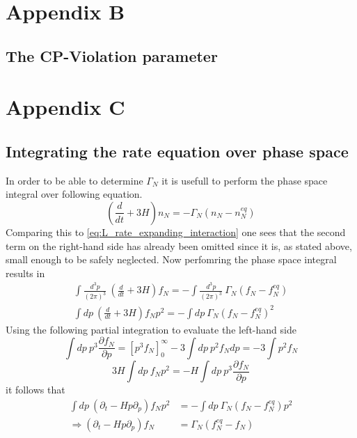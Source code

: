 \chapter{Appendix B}
\section{The CP-Violation parameter}








\chapter{Appendix C}
\section{Integrating the rate equation over phase space}
\label{ap:phase_space}
In order to be able to determine $\Gamma_N$ it is usefull to perform the phase space integral over following equation. 
\begin{equation*}
\left(\frac{d}{dt}+3H\right)n_N=-\Gamma_N\left(n_N-n_N^{eq}\right)
\end{equation*}
Comparing this to \ref{eq:L_rate_expanding_interaction} one sees that the second term on the right-hand side has already been omitted since it is, as stated above, small enough to be safely neglected. \newline
Now perfomring the phase space integral results in
\begin{align*}
\int\frac{d^3p}{\left(2\pi\right)^3}\: \left(\frac{d}{dt}+3H\right)f_N=-\int\frac{d^3p}{\left(2\pi\right)^3}\:\Gamma_N\left(f_N-f_N^{eq}\right)\\
\int dp\: \left(\frac{d}{dt}+3H\right)f_Np^2=-\int dp\:\Gamma_N\left(f_N-f_N^{eq}\right)^2
\end{align*}
Using the following partial integration to evaluate the left-hand side
\begin{equation*}
\int dp\:p^3\frac{\partial f_N}{\partial p}=\left[p^3f_N\right]_0^\infty-3\int dp\:p^2f_Ndp=-3\int p^2f_N
\end{equation*}
\begin{equation*}
3H\int dp\: f_Np^2=-H\int dp\: p^3\frac{\partial f_N}{\partial p}
\end{equation*}
it follows that
\begin{align*}
\int  dp\:\left(\partial_t-Hp\partial_p\right)f_Np^2&=-\int dp\:\Gamma_N\left(f_N-f_N^{eq}\right)p^2\\
\Rightarrow \left(\partial_t-Hp\partial_p\right)f_N&=\Gamma_N\left(f_N^{eq}-f_N\right)
\end{align*}
